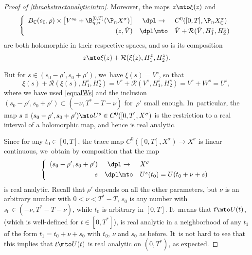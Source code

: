 \begin{proof}[Proof of \cref{thmabstractanalyticintro}]
Moreover, the maps $z\mto \xi(z)$ and
\begin{align*}
\left\{\begin{array}{rcl}
B_{\mathbb{C}}(s_0, \rho)\times \bigl[V^{s_0}+ \B_{\eta,\eta}^{[0,T]}(\P_n X^{\sigma})\bigr]&\dpl\to& C^0([0, T], \P_n X_{\mathbb{C}}^\sigma)\\[3pt]
(z,\Tilde{V})&\dpl\mto&\Tilde{V}+ \mathcal{R}(\Tilde{V},H_{1}^z,H_{2}^z)
\end{array}\right.
\end{align*}
are both holomorphic in their respective spaces, and so is its composition\vspace*{-3pt}
\[
z\mto \xi(z)+\mathcal{R}(\xi(z),H_{1}^z,H_{2}^z).
\]

But for $s\in (s_0-\rho',s_0+\rho')$, we~have $\xi(s)=V^s$, so that
\[
\xi(s)+\mathcal{R}(\xi(s),H_{1}^s,H_{2}^s)=V^s+\mathcal{R}(V^s,H_{1}^s,H_{2}^s)=V^s+W^s=U^s,
\]
where we have used \eqref{equalWs} and the inclusion $(s_0-\rho',s_0+\rho')\subset (-\nu,T^*-T-\nu)$ for~$\rho'$ small enough. In~particular, the map $s\in (s_0-\rho',s_0+\rho')\mto U^s\in C^0([0, T], X^\sigma)$ is the restriction to a real interval of a holomorphic map, and hence is real analytic.

Since for any $t_0\in [0,T]$, the trace map $C^0([0, T], X^\sigma)\to X^\sigma$ is linear continuous, we~obtain by composition that the map\vspace*{-3pt}
\begin{align*}
\left\{\begin{array}{rcl}
(s_0-\rho',s_0+\rho')&\dpl\to& X^\sigma\\[3pt]
s&\dpl\mto&U^s(t_0)=U(t_0+\nu+s)
\end{array}\right.
\end{align*}
is real analytic. Recall that $\rho'$ depends on all the other parameters, but $\nu$ is an arbitrary number with $0<\nu<T^*-T$, $s_0$ is any number with $s_0\in (-\nu,T^*-T-\nu)$, while $t_0$ is arbitrary in $[0,T]$. It~means that $t\mto U(t)$, (which is well-defined for $t\in [0,T^*]$), is real analytic in a neighborhood of any $t_1$ of the form $t_1=t_0+\nu+s_0$ with $t_0$, $\nu$ and $s_0$ as before. It~is not hard to see that this implies that $t\mto U(t)$ is real analytic on $(0,T^*)$, as expected.
\end{proof}
